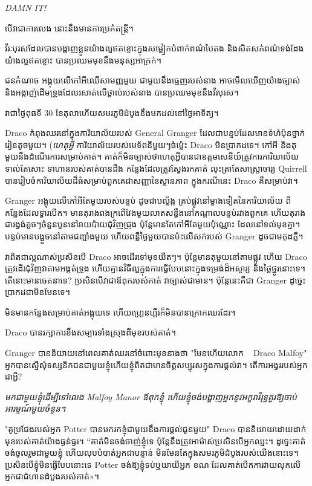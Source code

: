 {\emph{DAMN IT!}

\later

បើ​វា​ជា​ការ​លេង នោះ​នឹង​មាន​ការ​ប្រគំ​តន្ត្រី។

វីរៈបុរស​ដែល​បាន​បង្ហាញ​ខ្លួន​យ៉ាង​ល្អឥតខ្ចោះ​ក្នុង​សម្លៀកបំពាក់​ពណ៌​បៃតង និង​សិតសក់​ពណ៌ទង់ដែង​យ៉ាង​ល្អឥតខ្ចោះ បាន​ប្រឈមមុខ​នឹង​មនុស្ស​អាក្រក់។

ជនកំណាច អង្គុយលើកៅអីឈើសាមញ្ញមួយ ជាមួយនឹងធ្មេញរបស់នាង អាចមើលឃើញយ៉ាងច្បាស់ និងអង្កាញ់ដើមទ្រូងដែលរសាត់លើថ្ពាល់របស់នាង បានប្រឈមមុខនឹងវីរបុរស។

វាជាថ្ងៃពុធទី 30 ខែតុលាហើយសមរភូមិដំបូងនឹងមកដល់នៅថ្ងៃអាទិត្យ។

Draco កំពុងឈរនៅក្នុងការិយាល័យរបស់ General Granger ដែលជាបន្ទប់ដែលមានទំហំប៉ុនថ្នាក់រៀនតូចមួយ។ (\emph{ហេតុអ្វី} ការិយាល័យរបស់មេទ័ពនីមួយៗធំម៉្លេះ Draco មិនប្រាកដទេ។ កៅអី និងតុមួយនឹងដំណើរការសម្រាប់គាត់។ គាត់ក៏មិនច្បាស់ថាហេតុអ្វីបានជាឧត្តមសេនីយ៍ត្រូវការការិយាល័យទាល់តែសោះ ទាហានរបស់គាត់បានដឹង កន្លែងដែលត្រូវស្វែងរកគាត់ លុះត្រាតែសាស្រ្តាចារ្យ Quirrell បានរៀបចំការិយាល័យដ៏ធំសម្រាប់ពួកគេជាសញ្ញានៃស្ថានភាព ក្នុងករណីនេះ Draco គឺសម្រាប់វា។

Granger អង្គុយលើកៅអីតែមួយរបស់បន្ទប់ ដូចជាបល្ល័ង្ក គ្រប់ផ្លូវនៅម្ខាងទៀតនៃការិយាល័យ ពីកន្លែងដែលទ្វារបើក។ មានតុរាងពងក្រពើវែងមួយលាតសន្ធឹងនៅកណ្តាលបន្ទប់រវាងពួកគេ ហើយតុរាងជារង្វង់តូចៗចំនួនបួននៅរាយប៉ាយជុំវិញជ្រុង ប៉ុន្តែមានតែកៅអីតែមួយប៉ុណ្ណោះ ដែលនៅទល់មុខគ្នា។ បន្ទប់មានបង្អួចនៅតាមជញ្ជាំងមួយ ហើយពន្លឺថ្ងៃមួយបានប៉ះលើសក់របស់ Granger ដូចជាមកុដភ្លឺ។

វាពិតជាល្អណាស់ប្រសិនបើ Draco អាចដើរទៅមុខយឺតៗ។ ប៉ុន្តែមានតុមួយនៅតាមផ្លូវ ហើយ Draco ត្រូវដើរជុំវិញវាតាមអង្កត់ទ្រូង ហើយគ្មានវិធីល្អក្នុងការធ្វើបែបនោះក្នុងទម្រង់ដ៏អស្ចារ្យ និងថ្លៃថ្នូរនោះទេ។ តើនោះមានចេតនាទេ? ប្រសិនបើវាជាឪពុករបស់គាត់ វាច្បាស់ជាមាន។ ប៉ុន្តែនេះគឺជា Granger ដូច្នេះប្រាកដជាមិនមែនទេ។

មិនមានកន្លែងសម្រាប់គាត់អង្គុយទេ ហើយហ្គ្រេនហ្គឺរក៏មិនបានក្រោកឈរដែរ។

Draco បាន​រក្សា​ការ​ខឹង​សម្បារ​ទាំង​ស្រុង​ពី​មុខ​របស់​គាត់។

Granger បាននិយាយនៅពេលគាត់ឈរនៅចំពោះមុខនាងថា "មែនហើយលោក ~ Draco Malfoy" អ្នកបានស្នើសុំទស្សនិកជនជាមួយខ្ញុំហើយខ្ញុំពិតជាមានចិត្តសប្បុរសក្នុងការផ្តល់វា។ តើការអង្វររបស់អ្នកជាអ្វី?

\emph{មកជាមួយខ្ញុំដើម្បីទៅលេង Malfoy Manor ឪពុកខ្ញុំ ហើយខ្ញុំចង់បង្ហាញអ្នកនូវអក្ខរាវិរុទ្ធគួរឱ្យចាប់អារម្មណ៍មួយចំនួន។}

"គូប្រជែងរបស់អ្នក Potter បានមករកខ្ញុំជាមួយនឹងការផ្តល់ជូនមួយ" Draco បាននិយាយដោយដាក់មុខរបស់គាត់យ៉ាងធ្ងន់ធ្ងរ។ “គាត់​មិន​ចង់​ចាញ់​ខ្ញុំ​ទេ ប៉ុន្តែ​នឹង​ត្រូវ​អាម៉ាស់​ប្រសិន​បើ​អ្នក​ឈ្នះ។ ដូច្នេះ​គាត់​ចង់​ចូល​រួម​ជាមួយ​ខ្ញុំ ហើយ​លុប​បំបាត់​អ្នក​ជា​បន្ទាន់ មិន​មែន​តែ​ក្នុង​សមរភូមិ​ដំបូង​របស់​យើង​នោះ​ទេ​។ ប្រសិនបើ​ខ្ញុំ​មិន​ធ្វើ​បែប​នោះ​ទេ Potter ចង់​ឱ្យ​ខ្ញុំ​ទប់​ឬ​យាយី​អ្នក ខណៈ​ដែល​គាត់​បើក​ការ​វាយ​លុក​លើ​អ្នក​ជា​ជំហាន​ដំបូង​របស់​គាត់»។

}
